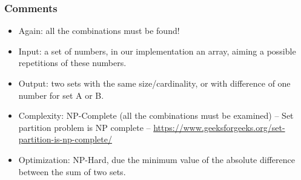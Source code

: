 \documentclass{beamer}
\begin{document}
\begin{frame}[fragile] 

	\frametitle{Comments} 

\begin{block}{}
  \begin{itemize}
 \item Again: all the combinations must be found!
  \item Input: a set of numbers, in our implementation an array, aiming a possible repetitions of these numbers.
  
  \item Output: two sets with the same size/cardinality, or with difference of one number for set A or B. 
  
  \item Complexity:	NP-Complete (all the combinations must be examined) -- Set partition problem is NP complete -- \url{https://www.geeksforgeeks.org/set-partition-is-np-complete/}
  
  \item Optimization: NP-Hard, due the minimum value of the absolute difference between the sum of two  sets.
  \end{itemize}
 \end{block}

\end{frame}


\end{document}
